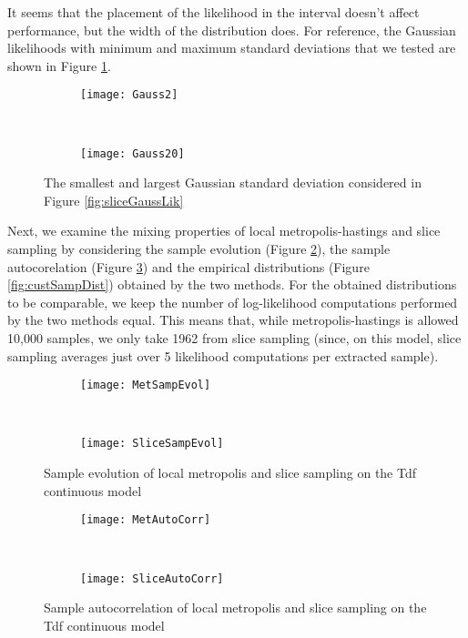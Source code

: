 It seems that the placement of the likelihood in the interval doesn't affect performance, but the width of the distribution does. For reference, the Gaussian likelihoods with minimum and maximum standard deviations that we tested are shown in Figure \ref{fig:gaussStdDev}.

\begin{figure}[h]
    \centering
    \begin{subfigure}[t]{0.48\textwidth}
      \texttt{[image: Gauss2]}
    \end{subfigure}
    ~
    \begin{subfigure}[t]{0.48\textwidth}
      \texttt{[image: Gauss20]}
    \end{subfigure}
    \caption{The smallest and largest Gaussian standard deviation considered in Figure \ref{fig:sliceGaussLik}}
    \label{fig:gaussStdDev}
\end{figure}

Next, we examine the mixing properties of local metropolis-hastings and slice sampling by considering the sample evolution (Figure \ref{fig:custSampEvol}), the sample autocorelation (Figure \ref{fig:custAutoCorr}) and the empirical distributions (Figure \ref{fig:custSampDist}) obtained by the two methods. For the obtained distributions to be comparable, we keep the number of log-likelihood computations performed by the two methods equal. This means that, while metropolis-hastings is allowed 10,000 samples, we only take 1962 from slice sampling (since, on this model, slice sampling averages just over 5 likelihood computations per extracted sample).

\begin{figure}[h]
    \centering
    \begin{subfigure}[t]{0.48\textwidth}
      \texttt{[image: MetSampEvol]}
    \end{subfigure}
    ~
    \begin{subfigure}[t]{0.48\textwidth}
      \texttt{[image: SliceSampEvol]}
    \end{subfigure}
    \caption{Sample evolution of local metropolis and slice sampling on the Tdf continuous model}
    \label{fig:custSampEvol}
\end{figure}

\begin{figure}[h]
    \centering
    \begin{subfigure}[t]{0.48\textwidth}
      \texttt{[image: MetAutoCorr]}
    \end{subfigure}
    ~
    \begin{subfigure}[t]{0.48\textwidth}
      \texttt{[image: SliceAutoCorr]}
    \end{subfigure}
    \caption{Sample autocorrelation of local metropolis and slice sampling on the Tdf continuous model}
    \label{fig:custAutoCorr}
\end{figure}

